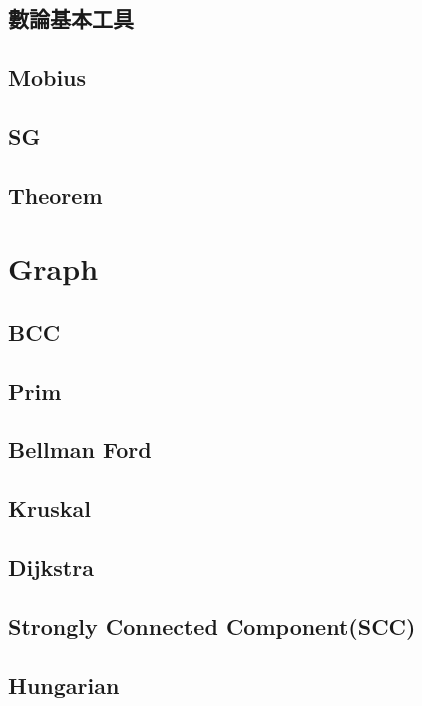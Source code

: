 \subsection{數論基本工具}

\subsection{Mobius}

\subsection{SG}

\subsection{Theorem}



\section{Graph}

\subsection{BCC}

\subsection{Prim}

\subsection{Bellman Ford}

\subsection{Kruskal}

\subsection{Dijkstra}

\subsection{Strongly Connected Component(SCC)}

\subsection{Hungarian}

